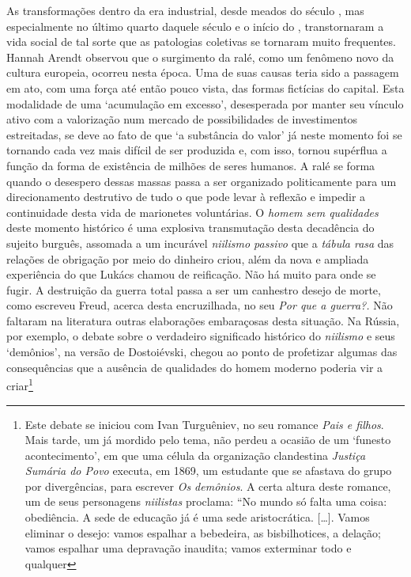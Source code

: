 {As transformações dentro da era industrial, desde meados do século ,
mas especialmente no último quarto daquele século e o início do ,
transtornaram a vida social de tal sorte que as patologias coletivas se
tornaram muito frequentes. Hannah Arendt observou que o surgimento da
ralé, como um fenômeno novo da cultura europeia, ocorreu nesta época.
Uma de suas causas teria sido a passagem em ato, com uma força até então
pouco vista, das formas fictícias do capital. Esta modalidade de uma
`acumulação em excesso', desesperada por manter seu vínculo ativo com a
valorização num mercado de possibilidades de investimentos estreitadas,
se deve ao fato de que `a substância do valor' já neste momento foi se
tornando cada vez mais difícil de ser produzida e, com isso, tornou
supérflua a função da forma de existência de milhões de seres humanos. A
ralé se forma quando o desespero dessas massas passa a ser organizado
politicamente para um direcionamento destrutivo de tudo o que pode levar
à reflexão e impedir a continuidade desta vida de marionetes
voluntárias. O \emph{homem sem qualidades} deste momento histórico é uma
explosiva transmutação desta decadência do sujeito burguês, assomada a
um incurável \emph{niilismo passivo} que a \emph{tábula rasa} das
relações de obrigação por meio do dinheiro criou, além da nova e
ampliada experiência do que Lukács chamou de reificação. Não há muito
para onde se fugir. A destruição da guerra total passa a ser um
canhestro desejo de morte, como escreveu Freud, acerca desta
encruzilhada, no seu \emph{Por que a guerra?.} Não faltaram na
literatura outras elaborações embaraçosas desta situação. Na Rússia, por
exemplo, o debate sobre o verdadeiro significado histórico do
\emph{niilismo} e seus `demônios', na versão de Dostoiévski, chegou ao
ponto de profetizar algumas das consequências que a ausência de
qualidades do homem moderno poderia vir a criar\footnote{Este debate se
  iniciou com Ivan Turguêniev, no seu romance \emph{Pais e filhos}. Mais
  tarde, um  já mordido pelo tema, não perdeu a ocasião de um
  `funesto acontecimento', em que uma célula da organização clandestina
  \emph{Justiça Sumária do Povo} executa, em 1869, um estudante que se
  afastava do grupo por divergências, para escrever \emph{Os demônios}.
  A certa altura deste romance, um de seus personagens \emph{niilistas}
  proclama: ``No mundo só falta uma coisa: obediência. A sede de
  educação já é uma sede aristocrática. [\ldots{}]. Vamos eliminar o
  desejo: vamos espalhar a bebedeira, as bisbilhotices, a delação; vamos
  espalhar uma depravação inaudita; vamos exterminar todo e qualquer
}}
